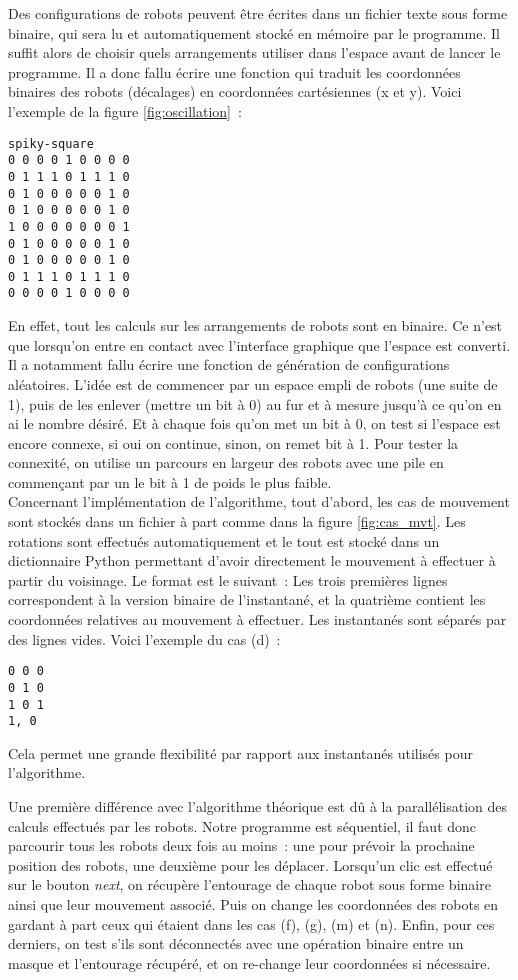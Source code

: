 Des configurations de robots peuvent être écrites dans un fichier texte sous
forme binaire, qui sera lu et automatiquement stocké en mémoire par le
programme. Il suffit alors de choisir quels arrangements utiliser dans l'espace
avant de lancer le programme. Il a donc fallu écrire une fonction qui traduit
les coordonnées binaires des robots (décalages) en coordonnées cartésiennes (x
et y). Voici l'exemple de la figure \ref{fig:oscillation}~: \\

\begin{verbatim}
spiky-square
0 0 0 0 1 0 0 0 0
0 1 1 1 0 1 1 1 0
0 1 0 0 0 0 0 1 0
0 1 0 0 0 0 0 1 0
1 0 0 0 0 0 0 0 1
0 1 0 0 0 0 0 1 0
0 1 0 0 0 0 0 1 0
0 1 1 1 0 1 1 1 0
0 0 0 0 1 0 0 0 0
\end{verbatim}

En effet, tout les calculs sur les arrangements de robots sont en binaire. Ce
n'est que lorsqu'on entre en contact avec l'interface graphique que l'espace
est converti. Il a notamment fallu écrire une fonction de génération de
configurations aléatoires. L'idée est de commencer par un espace empli de
robots (une suite de 1), puis de les enlever (mettre un bit à 0) au fur et à
mesure jusqu'à ce qu'on en ai le nombre désiré. Et à chaque fois qu'on met un
bit à 0, on test si l'espace est encore connexe, si oui on continue, sinon, on
remet bit à 1. Pour tester la connexité, on utilise un parcours en largeur des
robots avec une pile en commençant par un le bit à 1 de poids le plus faible.
\\

Concernant l'implémentation de l'algorithme, tout d'abord, les cas de mouvement
sont stockés dans un fichier à part comme dans la figure \ref{fig:cas_mvt}. Les
rotations sont effectués automatiquement et le tout est stocké dans un
dictionnaire Python permettant d'avoir directement le mouvement à effectuer à
partir du voisinage. Le format est le suivant~:
Les trois premières lignes correspondent à la version binaire de l'instantané,
et la quatrième contient les coordonnées relatives au mouvement à effectuer.
Les instantanés sont séparés par des lignes vides. Voici l'exemple du cas (d)~:
\begin{verbatim}
0 0 0
0 1 0
1 0 1
1, 0
\end{verbatim}
Cela permet une grande flexibilité par rapport aux instantanés utilisés pour
l'algorithme.

Une première différence avec l'algorithme théorique est dû à la parallélisation
des calculs effectués par les robots. Notre programme est séquentiel, il faut
donc parcourir tous les robots deux fois au moins~: une pour prévoir la
prochaine position des robots, une deuxième pour les déplacer.  Lorsqu'un clic
est effectué sur le bouton \emph{next}, on récupère l'entourage de chaque robot
sous forme binaire ainsi que leur mouvement associé. Puis on change les
coordonnées des robots en gardant à part ceux qui étaient dans les cas (f),
(g), (m) et (n). Enfin, pour ces derniers, on test s'ils sont déconnectés avec
une opération binaire entre un masque et l'entourage récupéré, et on re-change
leur coordonnées si nécessaire. \\

